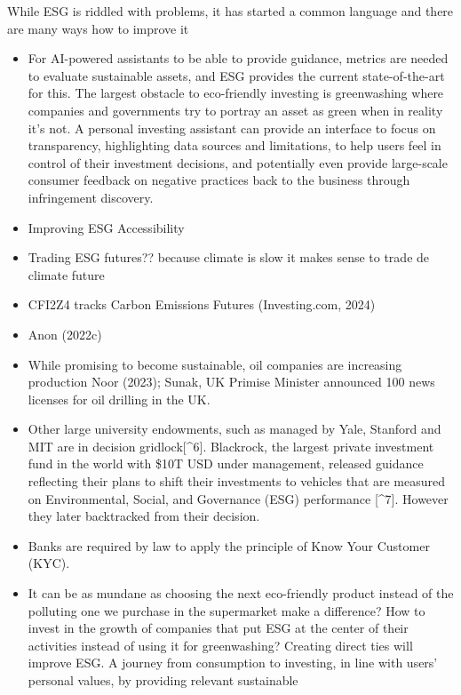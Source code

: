 \documentclass[
  letterpaper,
  DIV=11,
  numbers=noendperiod]{scrartcl}
\begin{document}
While ESG is riddled with problems, it has started a common language and
there are many ways how to improve it

\begin{itemize}
\item
  For AI-powered assistants to be able to provide guidance, metrics are
  needed to evaluate sustainable assets, and ESG provides the current
  state-of-the-art for this. The largest obstacle to eco-friendly
  investing is greenwashing where companies and governments try to
  portray an asset as green when in reality it's not. A personal
  investing assistant can provide an interface to focus on transparency,
  highlighting data sources and limitations, to help users feel in
  control of their investment decisions, and potentially even provide
  large-scale consumer feedback on negative practices back to the
  business through infringement discovery.
\item
  Improving ESG Accessibility
\item
  Trading ESG futures?? because climate is slow it makes sense to trade
  de climate future
\item
  CFI2Z4 tracks Carbon Emissions Futures (Investing.com, 2024)
\item
  Anon (2022c)
\item
  While promising to become sustainable, oil companies are increasing
  production Noor (2023); Sunak, UK Primise Minister announced 100 news
  licenses for oil drilling in the UK.
\item
  Other large university endowments, such as managed by Yale, Stanford
  and MIT are in decision gridlock{[}\^{}6{]}. Blackrock, the largest
  private investment fund in the world with \$10T USD under management,
  released guidance reflecting their plans to shift their investments to
  vehicles that are measured on Environmental, Social, and Governance
  (ESG) performance {[}\^{}7{]}. However they later backtracked from
  their decision.
\item
  Banks are required by law to apply the principle of Know Your Customer
  (KYC).
\item
  It can be as mundane as choosing the next eco-friendly product instead
  of the polluting one we purchase in the supermarket make a difference?
  How to invest in the growth of companies that put ESG at the center of
  their activities instead of using it for greenwashing? Creating direct
  ties will improve ESG. A journey from consumption to investing, in
  line with users' personal values, by providing relevant sustainable

\end{itemize}
\end{document}
